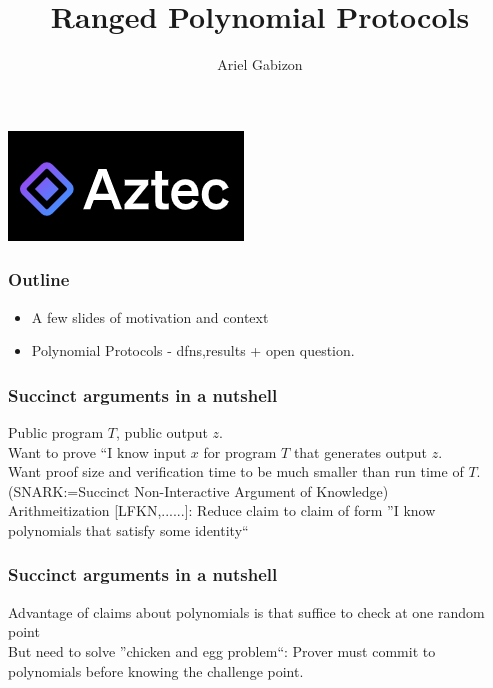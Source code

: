 \documentclass[shadesubsections,compress,14pt,mathserif]{beamer}
\title{\large{Ranged Polynomial Protocols}}    %
\author{\small{Ariel Gabizon }\\                 %
                                       }      %
\date{}                    %
\begin{document}
\boldmath
\begin{frame}
  \titlepage
  \includegraphics{azteclogo.png}
\end{frame}
\begin{frame}
 \frametitle{Outline}   %
 \begin{itemize}
  \item A few slides of motivation and context
  \item Polynomial Protocols -  dfns,results + open question.
 \end{itemize}

\end{frame}
\begin{frame}
 \frametitle{Succinct arguments in a nutshell}   %
 Public program $T$, public output $z$.\\ \pause
 \vspace{0.4in}
 Want to prove ``I know input $x$ for program $T$ that generates output $z$.\\ \pause
 \vspace{0.4in}
Want proof size and verification time to be much smaller than run time of $T$. \\ 
{\small (SNARK:=Succinct Non-Interactive Argument of Knowledge)}\\ \pause
 \vspace{0.4in}
 Arithmeitization {\small [LFKN,......]}: Reduce claim to claim of form ''I know polynomials that satisfy some identity`` \pause
\end{frame}
\begin{frame}
 \frametitle{Succinct arguments in a nutshell}   %
 Advantage of claims about polynomials is that suffice to check at one random point \\ \pause
 \vspace{0.4in}
 But need to solve ''chicken and egg problem``: Prover must commit to polynomials before knowing the challenge point. 
 \vspace{0.4in}
 
\end{frame}
\end{document}
